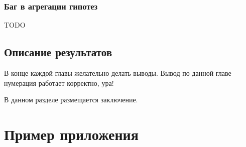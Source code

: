 \documentclass[times
              ]{itmo-student-thesis}
\begin{document}
    \subsection{Баг в агрегации гипотез}

      TODO

  \section{Описание результатов}

  \chapterconclusion %

    В конце каждой главы желательно делать выводы. Вывод по данной главе~--- нумерация работает корректно, ура!

\startconclusionpage

В данном разделе размещается заключение.

\printmainbibliography

\appendix

\chapter{Пример приложения}\label{sec:app:1}
\end{document}
